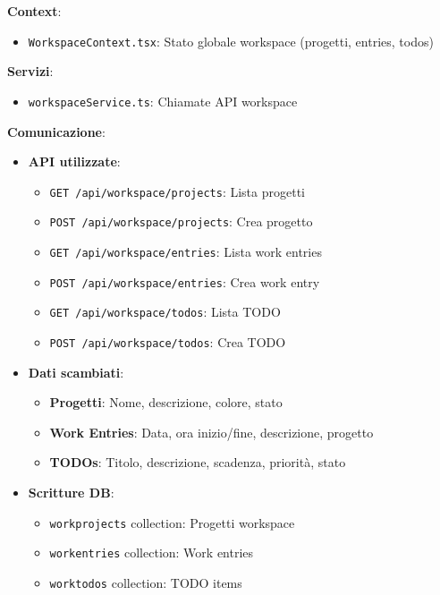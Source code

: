 \documentclass[11pt,a4paper]{article}
\begin{document}
\textbf{Context}:
\begin{itemize}
    \item \texttt{WorkspaceContext.tsx}: Stato globale workspace (progetti, entries, todos)
\end{itemize}

\textbf{Servizi}:
\begin{itemize}
    \item \texttt{workspaceService.ts}: Chiamate API workspace
\end{itemize}

\textbf{Comunicazione}:
\begin{itemize}
    \item \textbf{API utilizzate}: 
    \begin{itemize}
        \item \texttt{GET /api/workspace/projects}: Lista progetti
        \item \texttt{POST /api/workspace/projects}: Crea progetto
        \item \texttt{GET /api/workspace/entries}: Lista work entries
        \item \texttt{POST /api/workspace/entries}: Crea work entry
        \item \texttt{GET /api/workspace/todos}: Lista TODO
        \item \texttt{POST /api/workspace/todos}: Crea TODO
    \end{itemize}
    \item \textbf{Dati scambiati}: 
    \begin{itemize}
        \item \textbf{Progetti}: Nome, descrizione, colore, stato
        \item \textbf{Work Entries}: Data, ora inizio/fine, descrizione, progetto
        \item \textbf{TODOs}: Titolo, descrizione, scadenza, priorità, stato
    \end{itemize}
    \item \textbf{Scritture DB}: 
    \begin{itemize}
        \item \texttt{workprojects} collection: Progetti workspace
        \item \texttt{workentries} collection: Work entries
        \item \texttt{worktodos} collection: TODO items
    \end{itemize}
\end{itemize}
\end{document}
